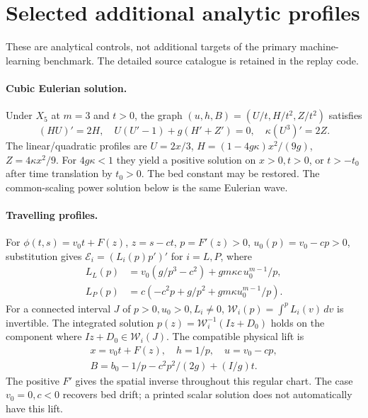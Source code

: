 \documentclass[12pt,a4paper,oneside]{report}
\numberwithin{equation}{chapter}
\theoremstyle{definition}
\theoremstyle{remark}\newtheorem{remark}[theorem]{Remark}
\newif\ifreviewmarks
\DeclareRobustCommand{\review}[1]{{\ifreviewmarks\color{authorblue}\fi #1}}
\begin{document}
\section{Selected additional analytic profiles}\label{app:other-profiles}
\review{These are analytical controls, not additional targets of the primary machine-learning benchmark. The detailed source catalogue is retained in the replay code.}

\paragraph{Cubic Eulerian solution.}
Under $X_5$ at $m=3$ and $t>0$, the graph $(u,h,B)=(U/t,H/t^2,Z/t^2)$ satisfies
\begin{equation}\label{eq:eulerian-cubic}
 (HU)'=2H,\quad U(U'-1)+g(H'+Z')=0,\quad \kappa(U^3)'=2Z.
\end{equation}
The linear/quadratic profiles are $U=2x/3$, $H=(1-4g\kappa)x^2/(9g)$, $Z=4\kappa x^2/9$. For $4g\kappa<1$ they yield a positive solution on $x>0,t>0$, or $t>-t_0$ after time translation by $t_0>0$. The bed constant may be restored. The common-scaling power solution below is the same Eulerian wave.

\paragraph{Travelling profiles.}
For $\phi(t,s)=v_0t+F(z)$, $z=s-ct$, $p=F'(z)>0$, $u_0(p)=v_0-cp>0$, substitution gives $\mathcal E_i=(L_i(p)p')'$ for $i=L,P$, where
\[
 \begin{aligned}
 L_L(p)&=v_0(g/p^3-c^2)+gm\kappa c\,u_0^{m-1}/p,\\
 L_P(p)&=c(-c^2p+g/p^2+gm\kappa u_0^{m-1}/p).
 \end{aligned}
\]
For a connected interval $J$ of $p>0,u_0>0,L_i\ne0$, $\mathcal W_i(p)=\int^p L_i(v)\,dv$ is invertible. The integrated solution $p(z)=\mathcal W_i^{-1}(Iz+D_0)$ holds on the component where $Iz+D_0\in\mathcal W_i(J)$. The compatible physical lift is
\[
 \begin{gathered}
 x=v_0t+F(z),\quad h=1/p,\quad u=v_0-cp,\\
 B=b_0-1/p-c^2p^2/(2g)+(I/g)t .
 \end{gathered}
\]
The positive $F'$ gives the spatial inverse throughout this regular chart. The case $v_0=0,c<0$ recovers bed drift; a printed scalar solution does not automatically have this lift.
\end{document}
